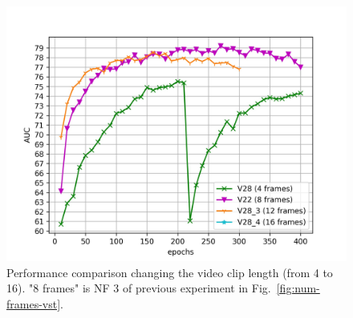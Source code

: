 \begin{figure}[t]
\centering
	\includegraphics[trim=0 0 0 0, clip, width=1.\linewidth]{images/exp_3.jpg}
	\caption{Performance comparison changing the video clip length (from 4 to 16). "8 frames" is NF 3 of previous experiment in Fig.~\ref{fig:num-frames-vst}.}
	\label{fig:random-batch}
\end{figure}



